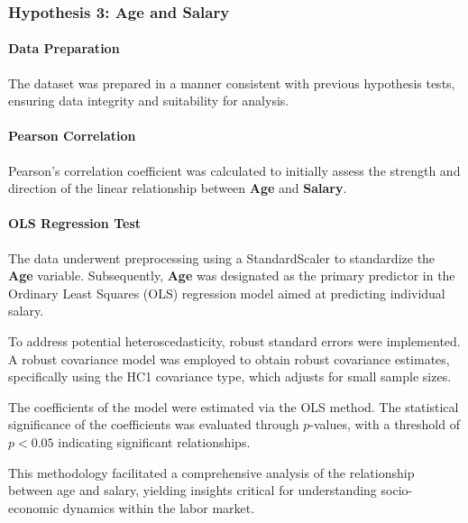 \subsubsection{Hypothesis 3: Age and Salary}

\paragraph{Data Preparation}
The dataset was prepared in a manner consistent with previous hypothesis tests, ensuring data integrity and suitability for analysis.

\paragraph{Pearson Correlation}
Pearson's correlation coefficient was calculated to initially assess the strength and direction of the linear relationship between \textbf{Age} and \textbf{Salary}.

\paragraph{OLS Regression Test}
The data underwent preprocessing using a StandardScaler to standardize the \textbf{Age} variable. Subsequently, \textbf{Age} was designated as the primary predictor in the Ordinary Least Squares (OLS) regression model aimed at predicting individual salary.

To address potential heteroscedasticity, robust standard errors were implemented. A robust covariance model was employed to obtain robust covariance estimates, specifically using the HC1 covariance type, which adjusts for small sample sizes.

The coefficients of the model were estimated via the OLS method. The statistical significance of the coefficients was evaluated through \( p \)-values, with a threshold of \( p < 0.05 \) indicating significant relationships.

This methodology facilitated a comprehensive analysis of the relationship between age and salary, yielding insights critical for understanding socio-economic dynamics within the labor market.
